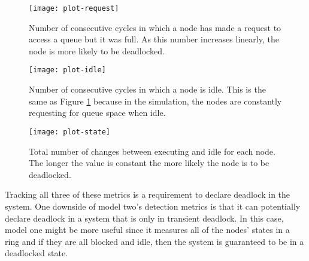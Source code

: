 \documentclass{article}
\begin{document}
\begin{figure}[H]
	\texttt{[image: plot-request]}
	\centering
	\caption{Number of consecutive cycles in which a node has made a request to access a queue but it was full. As this number increases linearly, the node is more likely to be deadlocked.}
	\label{fig:idle}
	\centering
\end{figure}

\begin{figure}[H]
	\texttt{[image: plot-idle]}
	\centering
	\caption{Number of consecutive cycles in which a node is idle. This is the same as Figure \ref{fig:idle} because in the simulation, the nodes are constantly requesting for queue space when idle.}
	\label{fig:request}
	\centering
\end{figure}

\begin{figure}[H]
	\texttt{[image: plot-state]}
	\centering
	\caption{Total number of changes between executing and idle for each node. The longer the value is constant the more likely the node is to be deadlocked.}
	\label{fig:state}
	\centering
\end{figure}

Tracking all three of these metrics is a requirement to declare deadlock in the system. One downside of model two's detection metrics is that it can potentially declare deadlock in a system that is only in transient deadlock. In this case, model one might be more useful since it measures all of the nodes' states in a ring and if they are all blocked and idle, then the system is guaranteed to be in a deadlocked state.


\end{document}
